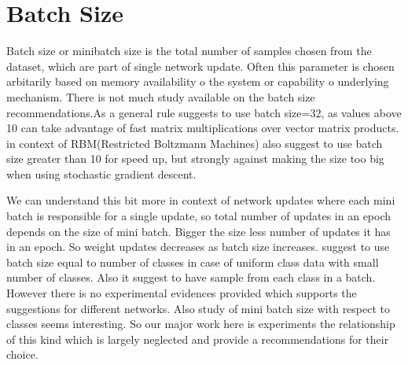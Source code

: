 \section{Batch Size}

Batch size or minibatch size is the total number of samples chosen from the dataset, which are part of single network update. Often this parameter is chosen arbitarily based on memory availability o the system or capability o underlying mechanism.
There is not much study available on the batch size recommendations.As a general rule \cite{DBLP:journals/corr/abs-1206-5533} suggests to use batch size=32, as values above 10 can take advantage of fast matrix multiplications over vector matrix products.
\cite{Hinton2012} in context of RBM(Restricted Boltzmann Machines) also suggest to use batch size greater than 10 for speed up, but strongly against making the size too big when using stochastic gradient descent.

We can understand this bit more in context of network updates where each mini batch is responsible for a single update, so total number of updates in an epoch depends on the size of mini batch. Bigger the size less number of updates it has in an epoch. So weight updates decreases as batch size increases. \cite{Hinton2012} suggest to use batch size equal to number of classes in case of uniform class data with small number of classes. 
Also it suggest to have sample from each class in a batch.
However there is no experimental evidences provided which supports the suggestions for different networks. Also study of mini batch size with respect to classes seems interesting. So our major work here is experiments the relationship of this kind which is largely neglected and provide a recommendations for their choice. 



 

